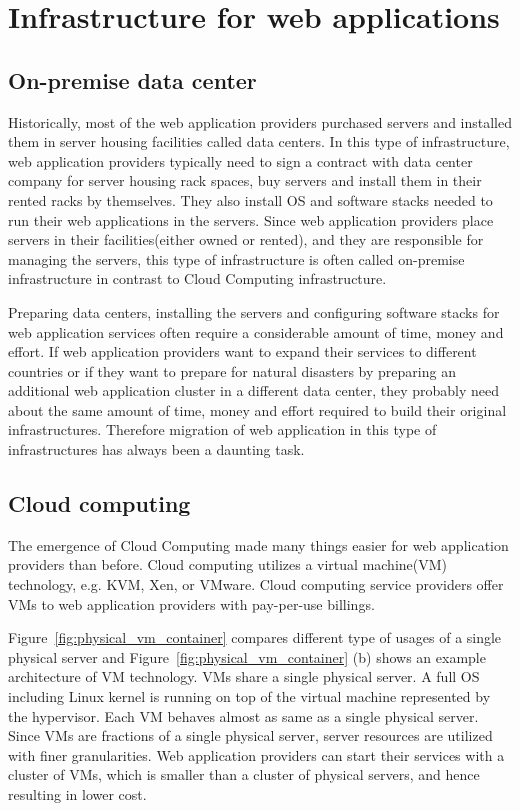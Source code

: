 \section{Infrastructure for web applications}

\subsection{On-premise data center}

Historically, most of the web application providers purchased servers and installed them in server housing facilities called data centers.
In this type of infrastructure, web application providers typically need to sign a contract with data center company for server housing rack spaces, buy servers and install them in their rented racks by themselves.
They also install OS and software stacks needed to run their web applications in the servers.
Since web application providers place servers in their facilities(either owned or rented), and they are responsible for managing the servers, this type of infrastructure is often called on-premise infrastructure in contrast to Cloud Computing infrastructure.

Preparing data centers, installing the servers and configuring software stacks for web application services often require a considerable amount of time, money and effort.
If web application providers want to expand their services to different countries or if they want to prepare for natural disasters by preparing an additional web application cluster in a different data center, they probably need about the same amount of time, money and effort required to build their original infrastructures.
Therefore migration of web application in this type of infrastructures has always been a daunting task.

\subsection{Cloud computing}

The emergence of Cloud Computing made many things easier for web application providers than before.
Cloud computing utilizes a virtual machine(VM) technology, e.g. KVM, Xen, or VMware.
Cloud computing service providers offer VMs to web application providers with pay-per-use billings.

Figure~\ref{fig:physical_vm_container} compares different type of usages of a single physical server and Figure~\ref{fig:physical_vm_container} (b) shows an example architecture of VM technology.
VMs share a single physical server.
A full OS including Linux kernel is running on top of the virtual machine represented by the hypervisor.
Each VM behaves almost as same as a single physical server.
Since VMs are fractions of a single physical server, server resources are utilized with finer granularities.
Web application providers can start their services with a cluster of VMs, which is smaller than a cluster of physical servers, and hence resulting in lower cost.

